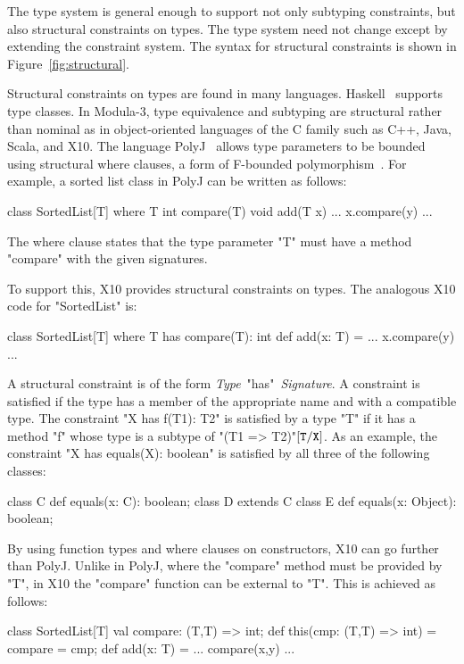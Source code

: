 \documentclass{llncs}
\begin{document}
The type system is general enough to support not only subtyping
constraints, but also structural constraints on types.  The type
system need not change except by extending the constraint
system.  The syntax for structural constraints is shown in
Figure~\ref{fig:structural}.

Structural constraints on types are found in many languages.
Haskell~\cite{haskell} supports type classes.
In Modula-3, type equivalence and subtyping are structural
rather than nominal as in object-oriented languages of the C
family such as C++, Java, Scala, and X10.
%
The language PolyJ~\cite{polyj} allows type parameters to be bounded using
structural where clauses, a form of F-bounded
polymorphism~\cite{fbounds}.
For example, a sorted list class in PolyJ can be written as follows:
\begin{xten}
class SortedList[T] where T { int compare(T) } {
    void add(T x) { ... x.compare(y) ... }
}
\end{xten}
The where clause states that the type parameter \xcd"T" must have a
method \xcd"compare" with the given signatures.

To support this, X10 provides structural constraints on types.
The analogous X10 code for \xcd"SortedList" is:
\begin{xten}
class SortedList[T] where T has compare(T): int {
    def add(x: T) = { ... x.compare(y) ... }
}
\end{xten}

A structural constraint is of the form \emph{Type}~\xcd"has"~\emph{Signature}.
A constraint is satisfied if the type has a member of the appropriate name
and with a compatible type.  
The constraint \xcd"X has f(T1): T2"
is satisfied by a type \xcd"T" if it has a method \xcd"f"
whose type is a subtype of \xcd"(T1 => T2)"$[{\tt T}/{\tt X}]$.
As an example,
the constraint \xcd"X has equals(X): boolean"
is satisfied by all three of the following classes:
\begin{xten}
class C { def equals(x: C): boolean; }
class D extends C { }
class E { def equals(x: Object): boolean; }
\end{xten}

By using function types and where clauses on constructors,
X10 can go further than PolyJ.
Unlike in PolyJ, where the \xcd"compare" method must be provided by \xcd"T",
in X10 the \xcd"compare" function can be external to \xcd"T".
This is achieved as follows:
\begin{xten}
class SortedList[T] {
    val compare: (T,T) => int;
    def this(cmp: (T,T) => int) = { compare = cmp; }
    def add(x: T) = { ... compare(x,y) ... }
}
\end{xten}
\end{document}

